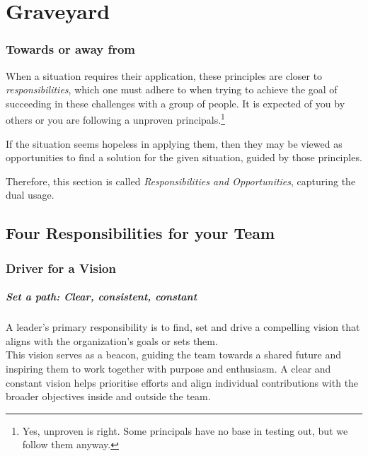 \chapter{Graveyard}

\subsection{Towards or away from} 

When a situation requires their application, these principles are closer to \textit{responsibilities}, which one must adhere to when trying to achieve the goal of succeeding in these challenges with a group of people. It is expected of you by others or you are following a unproven principals.\footnote{
	Yes, unproven is right. Some principals have no base in testing out, but we follow them anyway.
}

If the situation seems hopeless in applying them, then they may be viewed as opportunities to find a solution for the given situation, guided by those principles.

Therefore, this section is called \textit{Responsibilities and Opportunities}, capturing the dual usage.

\section{Four Responsibilities for your Team}

\subsection{Driver for a Vision}\label{responsibility__driver}

\paragraph{Set a path: Clear, consistent, constant}

A leader's primary responsibility is to find, set and drive a compelling vision that aligns with the organization's goals or sets them.\\

This vision serves as a beacon, guiding the team towards a shared future and inspiring them to work together with purpose and enthusiasm.
A clear and constant vision helps prioritise efforts and align individual contributions with the broader objectives inside and outside the team.

